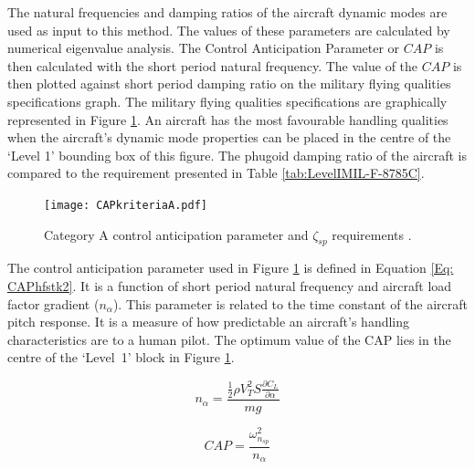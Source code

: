 \documentclass{report}
\begin{document}
The natural frequencies and damping ratios of the aircraft dynamic modes are used as input to this method.  The values of these parameters are calculated by numerical eigenvalue analysis.  The Control Anticipation Parameter or $CAP$ is then calculated with the short period natural frequency.  The value of the $CAP$ is then plotted against short period damping ratio on the military flying qualities specifications graph.  The military flying qualities specifications are graphically represented in Figure \ref{fig: CAPdampRequire}.  An aircraft has the most favourable handling qualities when the aircraft's dynamic mode properties can be placed in the centre of the `Level 1' bounding box of this figure.  The phugoid damping ratio of the aircraft is compared to the requirement presented in Table \ref{tab:LevelIMIL-F-8785C}.

\begin{figure}[htb]
	\begin{center}
		\texttt{[image: CAPkriteriaA.pdf]}
	\end{center}

	\caption{Category A control anticipation parameter and $\zeta_{sp}$ requirements \citep{Wigartikel}.}
	\label{fig: CAPdampRequire}
\end{figure}

The control anticipation parameter used in Figure \ref{fig: CAPdampRequire} is defined in Equation \ref{Eq: CAPhfstk2}.  It is a function of short period natural frequency and aircraft load factor gradient ($n_\alpha$).  This parameter is related to the time constant of the aircraft pitch response.  It is a measure of how predictable an aircraft's handling characteristics are to a human pilot.  The optimum value of the CAP lies in the centre of the \mbox{`Level 1'} block in Figure \ref{fig: CAPdampRequire}.  

\begin{equation}\label{Eq: LoadFactorGradient}
	n_\alpha = \frac{\frac{1}{2} \rho V_T^2 S \frac{\partial C_L}{\partial{\alpha}}}{mg} 	
\end{equation}


\begin{equation}\label{Eq: CAPhfstk2}
	CAP = \frac{\omega_{n_{sp}}^2}{n_\alpha}
\end{equation}

\end{document}
